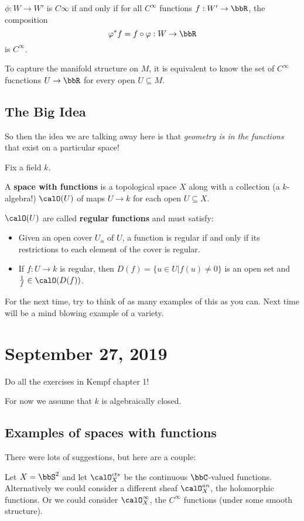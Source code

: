 \documentclass[12pt]{article}
\begin{document}
$\phi:W\to W'$ is $C\infty$ if and only if for all $C^\infty$ functions $f:W'\to \bbR$,
the composition
\[\varphi^\ast f=f\circ \varphi:W\to \bbR\]
is $C^\infty$.

To capture the manifold structure on $M$, it is equivalent to know the set of $C^\infty$ fucnctions $U\to \bbR$ for every open $U\subseteq M$.

\subsection{The Big Idea}
So then the idea we are talking away here is that \textit{geometry is in the functions} that exist on a particular space!

Fix a field $k$. 
\begin{defn}
	A \textbf{space with functions} is a topological space $X$ along with a collection (a $k$-algebra!) $\calO(U)$ of maps $U\to k$ for each open 
	$U\subseteq X$. 

	$\calO(U)$ are called \textbf{regular functions} and must satisfy:
	\begin{itemize}
		\item Given an open cover $U_\alpha$ of $U$, a function is regular if and only if its restrictions to each element of the cover is regular.
		\item If $f:U\to k$ is regular, then $D(f)=\{u\in U|f(u)\ne 0\}$ is an open set and $\frac{1}{f}\in\calO(D(f))$.
	\end{itemize}
\end{defn}

For the next time, try to think of as many examples of this as you can. Next time will be a mind blowing example of a variety.

\section{September 27, 2019}
\begin{prob}
	Do all the exercises in Kempf chapter 1!
\end{prob}

For now we assume that $k$ is algebraically closed.

\subsection{Examples of spaces with functions}
There were lots of suggestions, but here are a couple:
\begin{ex}
	Let $X=\bbS^2$ and let $\calO_X^{cts}$ be the continuous $\bbC$-valued functions. Alternatively
	we could consider a different sheaf $\calO_X^{an}$, the holomorphic functions. Or we could 
	consider $\calO_X^\infty$, the $C^\infty$ functions (under some smooth structure).
\end{ex}
\end{document}

